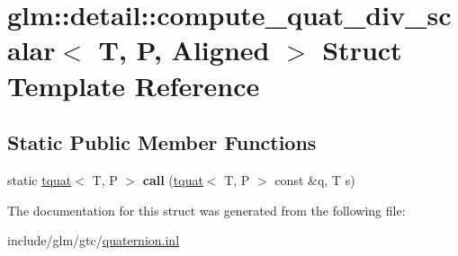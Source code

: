 \hypertarget{structglm_1_1detail_1_1compute__quat__div__scalar}{}\section{glm\+:\+:detail\+:\+:compute\+\_\+quat\+\_\+div\+\_\+scalar$<$ T, P, Aligned $>$ Struct Template Reference}
\label{structglm_1_1detail_1_1compute__quat__div__scalar}
\subsection*{Static Public Member Functions}
\begin{DoxyCompactItemize}
\item 
\mbox{\label{structglm_1_1detail_1_1compute__quat__div__scalar_a7d45d4dd6252d1d5d43d396a0d1bc51a}} 
static \hyperlink{structglm_1_1tquat}{tquat}$<$ T, P $>$ {\bfseries call} (\hyperlink{structglm_1_1tquat}{tquat}$<$ T, P $>$ const \&q, T s)
\end{DoxyCompactItemize}


The documentation for this struct was generated from the following file\+:\begin{DoxyCompactItemize}
\item 
include/glm/gtc/\hyperlink{gtc_2quaternion_8inl}{quaternion.\+inl}\end{DoxyCompactItemize}

